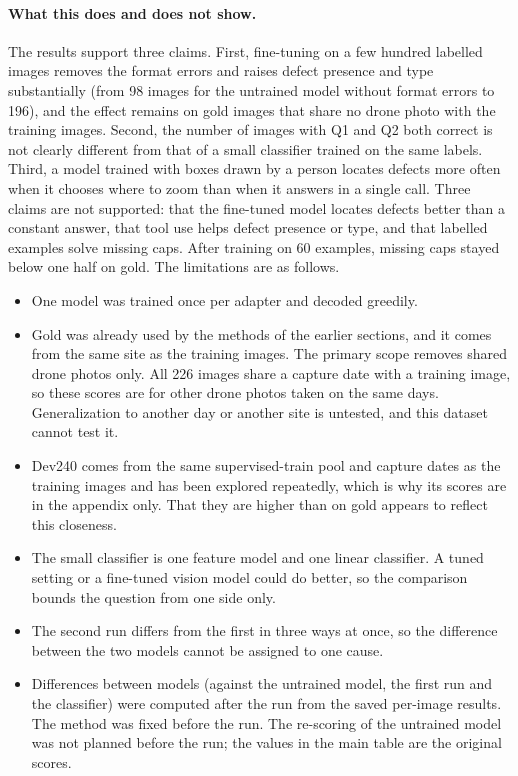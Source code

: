 \documentclass[11pt]{article}
\begin{document}
\paragraph{What this does and does not show.} The results support three claims. First, fine-tuning on a few hundred labelled images removes the format errors and raises defect presence and type substantially (from 98 images for the untrained model without format errors to 196), and the effect remains on gold images that share no drone photo with the training images. Second, the number of images with Q1 and Q2 both correct is not clearly different from that of a small classifier trained on the same labels. Third, a model trained with boxes drawn by a person locates defects more often when it chooses where to zoom than when it answers in a single call. Three claims are not supported: that the fine-tuned model locates defects better than a constant answer, that tool use helps defect presence or type, and that labelled examples solve missing caps. After training on 60 examples, missing caps stayed below one half on gold. The limitations are as follows.
\begin{itemize}
  \item One model was trained once per adapter and decoded greedily.
  \item Gold was already used by the methods of the earlier sections, and it comes from the same site as the training images. The primary scope removes shared drone photos only. All 226 images share a capture date with a training image, so these scores are for other drone photos taken on the same days. Generalization to another day or another site is untested, and this dataset cannot test it.
  \item Dev240 comes from the same supervised-train pool and capture dates as the training images and has been explored repeatedly, which is why its scores are in the appendix only. That they are higher than on gold appears to reflect this closeness.
  \item The small classifier is one feature model and one linear classifier. A tuned setting or a fine-tuned vision model could do better, so the comparison bounds the question from one side only.
  \item The second run differs from the first in three ways at once, so the difference between the two models cannot be assigned to one cause.
  \item Differences between models (against the untrained model, the first run and the classifier) were computed after the run from the saved per-image results. The method was fixed before the run. The re-scoring of the untrained model was not planned before the run; the values in the main table are the original scores.
\end{itemize}
\end{document}

